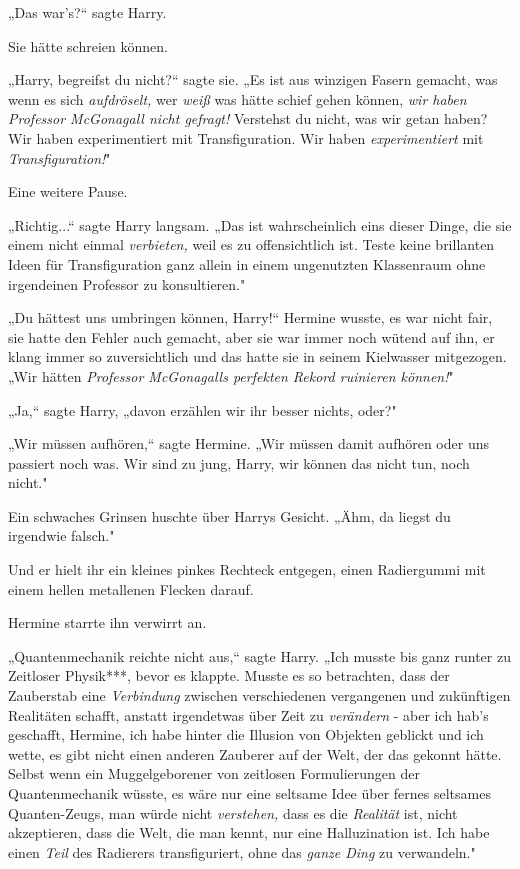 {„Das war's?“ sagte Harry.

Sie hätte schreien können.

„Harry, begreifst du nicht?“ sagte sie. „Es ist aus winzigen Fasern gemacht, was wenn es sich \emph{aufdröselt,} wer \emph{weiß} was hätte schief gehen können, \emph{wir haben Professor McGonagall nicht gefragt!} Verstehst du nicht, was wir getan haben? Wir haben experimentiert mit Transfiguration. Wir haben \emph{experimentiert} mit \emph{Transfiguration!}"

Eine weitere Pause.

„Richtig...“ sagte Harry langsam. „Das ist wahrscheinlich eins dieser Dinge, die sie einem nicht einmal \emph{verbieten,} weil es zu offensichtlich ist. Teste keine brillanten Ideen für Transfiguration ganz allein in einem ungenutzten Klassenraum ohne irgendeinen Professor zu konsultieren."

„Du hättest uns umbringen können, Harry!“ Hermine wusste, es war nicht fair, sie hatte den Fehler auch gemacht, aber sie war immer noch wütend auf ihn, er klang immer so zuversichtlich und das hatte sie in seinem Kielwasser mitgezogen. „Wir hätten \emph{Professor McGonagalls perfekten Rekord ruinieren können!}"

„Ja,“ sagte Harry, „davon erzählen wir ihr besser nichts, oder?"

„Wir müssen aufhören,“ sagte Hermine. „Wir müssen damit aufhören oder uns passiert noch was. Wir sind zu jung, Harry, wir können das nicht tun, noch nicht."

Ein schwaches Grinsen huschte über Harrys Gesicht. „Ähm, da liegst du irgendwie falsch."

Und er hielt ihr ein kleines pinkes Rechteck entgegen, einen Radiergummi mit einem hellen metallenen Flecken darauf.

Hermine starrte ihn verwirrt an.

„Quantenmechanik reichte nicht aus,“ sagte Harry. „Ich musste bis ganz runter zu Zeitloser Physik***, bevor es klappte. Musste es so betrachten, dass der Zauberstab eine \emph{Verbindung} zwischen verschiedenen vergangenen und zukünftigen Realitäten schafft, anstatt irgendetwas über Zeit zu \emph{verändern} - aber ich hab's geschafft, Hermine, ich habe hinter die Illusion von Objekten geblickt und ich wette, es gibt nicht einen anderen Zauberer auf der Welt, der das gekonnt hätte. Selbst wenn ein Muggelgeborener von zeitlosen Formulierungen der Quantenmechanik wüsste, es wäre nur eine seltsame Idee über fernes seltsames Quanten-Zeugs, man würde nicht \emph{verstehen,} dass es die \emph{Realität} ist, nicht akzeptieren, dass die Welt, die man kennt, nur eine Halluzination ist. Ich habe einen \emph{Teil} des Radierers transfiguriert, ohne das \emph{ganze Ding} zu verwandeln."

}
